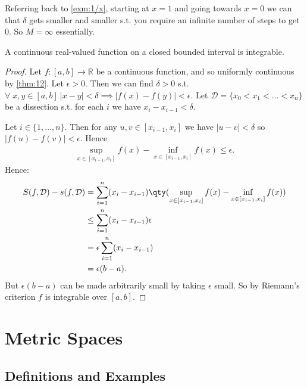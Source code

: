     \begin{remark}
        Referring back to \cref{exm:1/x}, starting at $x = 1$ and going towards $x  = 0$ we can that $\delta$ gets smaller and smaller s.t. you require an infinite number of steps to get $0$.
        So $M = \infty$ essentially.
    \end{remark} 

    \begin{corollary} \label{cor:14}
        A continuous real-valued function on a closed bounded interval is integrable.
    \end{corollary} 

    \begin{proof}
        Let $f:[a, b] \to \mathbb{R}$ be a continuous function, and so uniformly continuous by \cref{thm:12}.
        Let $\epsilon > 0$.
        Then we can find $\delta > 0$ s.t. $\forall \; x, y \in [a, b] \ |x - y| < \delta \implies |f(x) - f(y)| < \epsilon$.
        Let $\mathcal{D} = \{ x_0 < x_1 < \dots < x_n\}$ be a dissection s.t. for each $i$ we have $x_i - x_{i-1} < \delta$.

        Let $i \in \{1, \dots, n\}$.
        Then for any $u, v \in [x_{i-1}, x_i]$ we have $|u - v| < \delta$ so $|f(u) - f(v)| < \epsilon$.
        Hence 
        \begin{align*}
            \sup_{x \in [x_{i-1}, x_i]} f(x) - \inf_{x \in [x_{i-1}, x_i]} f(x) \leq \epsilon.
        \end{align*} 
        Hence:
        \begin{align*}
            S(f, \mathcal{D}) - s(f, \mathcal{D}) &= \sum_{i=1}^{n} (x_i - x_{i-1}) \qty(\sup_{x \in [x_{i-1}, x_i]} f(x) - \inf_{x \in [x_{i-1}, x_i]} f(x)) \\
            &\leq \sum_{i=1}^{n} (x_i - x_{i - 1}) \epsilon \\
            &= \epsilon \sum_{i=1}^{n} (x_i - x_{i - 1}) \\
            &= \epsilon (b - a).
        \end{align*} 
        But $\epsilon(b-a)$ can be made arbitrarily small by taking $\epsilon$ small.
        So by Riemann's criterion $f$ is integrable over $[a, b]$.
    \end{proof} 

    \section{Metric Spaces}
    \subsection{Definitions and Examples}


